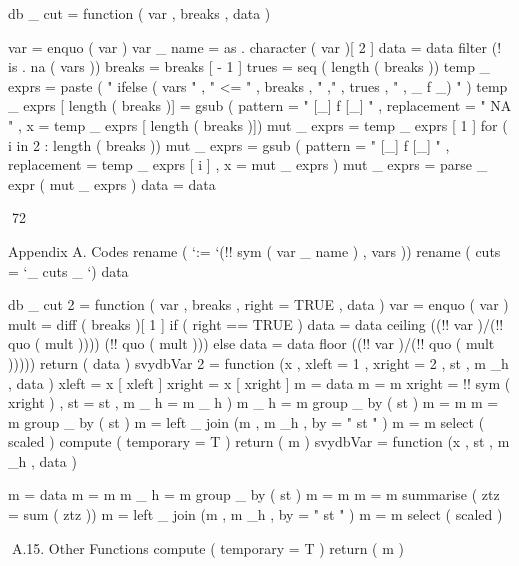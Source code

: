 db _ cut = function ( var , breaks , data ) {
var = enquo ( var )
var _ name = as . character ( var )[ 2 ]
data = data %
filter (! is . na ( vars ))
breaks = breaks [ - 1 ]
trues = seq ( length ( breaks ))
temp _ exprs = paste ( " ifelse ( vars " , " <= " , breaks ,
" ," , trues , " , _ f _) " )
temp _ exprs [ length ( breaks )] = gsub ( pattern = " [_] f [_] " ,
replacement = " NA " , x = temp _ exprs [ length ( breaks )])
mut _ exprs = temp _ exprs [ 1 ]
for ( i in 2 : length ( breaks )) {
mut _ exprs = gsub ( pattern = " [_] f [_] " ,
replacement = temp _ exprs [ i ] , x = mut _ exprs )
}
mut _ exprs = parse _ expr ( mut _ exprs )
data = data %

72

Appendix A. Codes
rename ( ‘:= ‘(!! sym ( var _ name ) , vars )) %
rename ( cuts = ‘_ cuts _ ‘)
data

}
db _ cut 2 = function ( var , breaks , right = TRUE ,
data ) {
var = enquo ( var )
mult = diff ( breaks )[ 1 ]
if ( right == TRUE ) {
data = data %
ceiling ((!! var )/(!! quo ( mult )))) (!! quo ( mult )))
} else {
data = data %
floor ((!! var )/(!! quo ( mult )))))
}
return ( data )
}
svydbVar 2 = function (x , xleft = 1 , xright = 2 ,
st , m _h , data ) {
xleft = x [ xleft ]
xright = x [ xright ]
m = data
m = m %
xright = !! sym ( xright ) , st = st , m _ h = m _ h )
m _ h = m %
group _ by ( st ) %
m = m %
m = m %
group _ by ( st ) %
m = left _ join (m , m _h , by = " st " )
m = m %
select ( scaled ) %
compute ( temporary = T ) %
return ( m )
}
svydbVar = function (x , st , m _h , data ) {
m = data
m = m %
m _ h = m %
group _ by ( st ) %
m = m %
m = m %
summarise ( ztz = sum ( ztz ))
m = left _ join (m , m _h , by = " st " )
m = m %
select ( scaled ) %

A.15. Other Functions
compute ( temporary = T ) %
return ( m )
}
